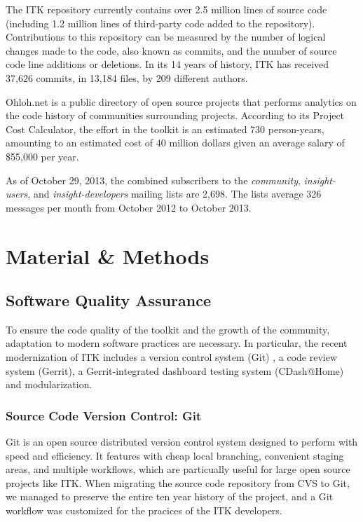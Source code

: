 \documentclass{frontiersENG} %
\begin{document}
%
%
The ITK repository currently contains over 2.5 million lines of source code
(including 1.2 million lines of third-party code added to the repository).
Contributions to this repository can be measured by the number of logical
changes made to the code, also known as commits, and the number of source code
line additions or deletions. In its 14 years of history, ITK has received
37,626 commits, in 13,184 files, by 209 different authors.

Ohloh.net \cite{OhlohITK2013} is a public directory of open source projects
that performs analytics on the code history of communities surrounding
projects. According to its Project Cost Calculator, the effort in the toolkit
is an estimated 730 person-years, amounting to an estimated cost of 40 million
dollars given an average salary of \$55,000 per year.

As of October 29, 2013, the combined subscribers to the \textit{community},
\textit{insight-users}, and \textit{insight-developers} mailing lists are 2,698.
The lists average 326 messages per month from October 2012 to October 2013.


\section{Material \& Methods}

\subsection{Software Quality Assurance}

To ensure the code quality of the toolkit and the growth of the community,
adaptation to modern software practices are necessary. In particular, the
recent modernization of ITK includes a version control system (Git) , a code
review system (Gerrit), a Gerrit-integrated dashboard testing system
(CDash@Home) and modularization.

\subsubsection{Source Code Version Control: Git} Git is an open source
distributed version control system designed to perform with speed and
efficiency. It features with cheap local branching, convenient staging areas,
and multiple workflows, which are particually useful for large open source
projects like ITK. When migrating the source code repository from CVS to Git,
we managed to preserve the entire ten year history of the project, and  a Git
workflow was customized for the pracices of the ITK developers.
\end{document}
